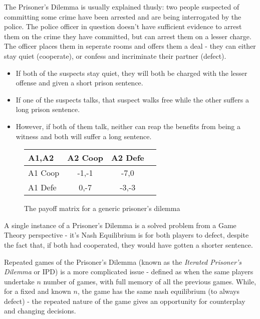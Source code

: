 \documentclass{article}
\begin{document}
The Prisoner's Dilemma is usually explained thusly: two people suspected of committing some crime have been arrested and are being interrogated by the police. The police officer in question doesn't have sufficient evidence to arrest them on the crime they have committed, but can arrest them on a lesser charge. The officer places them in seperate rooms and offers them a deal - they can either stay quiet (cooperate), or confess and incriminate their partner (defect).
\begin{itemize}
	\item If both of the suspects stay quiet, they will both be charged with the lesser offense and given a short prison sentence.
	\item If one of the suspects talks, that suspect walks free while the other suffers a long prison sentence.
	\item However, if both of them talk, neither can reap the benefits from being a witness and both will suffer a long sentence.
\end{itemize}
	\begin{figure}
		\label{fig:generic-prisoners-dilemma}
		\caption{The payoff matrix for a generic prisoner's dilemma}
		\begin{tabular}{| l || c | c | c |}
			\hline
			A1,A2 & A2 Coop & A2 Defe \\ \hline
			A1 Coop & -1,-1 & -7,0 \\ \hline  
			A1 Defe & 0,-7 & -3,-3  \\ \hline
		\end{tabular}
	\end{figure}

A single instance of a Prisoner's Dilemma is a solved problem from a Game Theory perspective - it's Nash Equilibrium is for both players to defect, despite the fact that, if both had cooperated, they would have gotten a shorter sentence.

Repeated games of the Prisoner's Dilemma (known as the \emph{Iterated Prisoner's Dilemma} or IPD) is a more complicated issue - defined as when the same players undertake $n$ number of games, with full memory of all the previous games. While, for a fixed and known $n$, the game has the same nash equilibrium (to always defect) - the repeated nature of the game gives an opportunity for counterplay and changing decisions.
\end{document}
